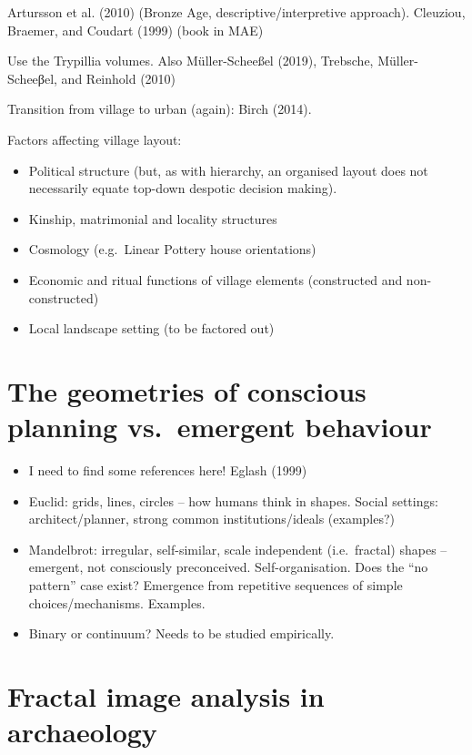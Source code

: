 \documentclass[
  12pt,
]{book}
\begin{document}
Artursson et al. (2010) (Bronze Age, descriptive/interpretive approach). Cleuziou, Braemer, and Coudart (1999) (book in MAE)

Use the Trypillia volumes. Also Müller-Scheeßel (2019), Trebsche, Müller-Scheeβel, and Reinhold (2010)

Transition from village to urban (again): Birch (2014).

Factors affecting village layout:

\begin{itemize}
\item
  Political structure (but, as with hierarchy, an organised layout does not necessarily equate top-down despotic decision making).
\item
  Kinship, matrimonial and locality structures
\item
  Cosmology (e.g.~Linear Pottery house orientations)
\item
  Economic and ritual functions of village elements (constructed and non-constructed)
\item
  Local landscape setting (to be factored out)
\end{itemize}

\hypertarget{the-geometries-of-conscious-planning-vs.-emergent-behaviour}{%
\section{The geometries of conscious planning vs.~emergent behaviour}\label{the-geometries-of-conscious-planning-vs.-emergent-behaviour}}

\begin{itemize}
\item
  I need to find some references here! Eglash (1999)
\item
  Euclid: grids, lines, circles -- how humans think in shapes. Social settings: architect/planner, strong common institutions/ideals (examples?)
\item
  Mandelbrot: irregular, self-similar, scale independent (i.e.~fractal) shapes -- emergent, not consciously preconceived. Self-organisation. Does the ``no pattern'' case exist? Emergence from repetitive sequences of simple choices/mechanisms. Examples.
\item
  Binary or continuum? Needs to be studied empirically.
\end{itemize}

\hypertarget{image-archaeo}{%
\section{Fractal image analysis in archaeology}\label{image-archaeo}}
\end{document}
